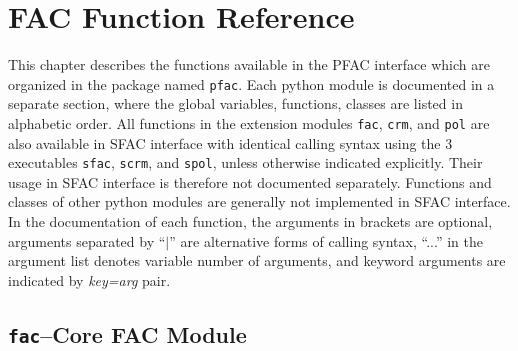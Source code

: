 \documentclass[twoside,letterpaper]{refrep}
\newcommand{\var}[1]{\textit{#1}}
\newcommand{\mod}[1]{\texttt{#1}}
\begin{document}
\chapter{FAC Function Reference}
\label{cha:function}
This chapter describes the functions available in the PFAC interface which are
organized in the package named \mod{pfac}. Each
python module is documented in a separate section, where the global variables,
functions, classes are listed in alphabetic order. All functions in the
extension modules \mod{fac}, \mod{crm}, and \mod{pol} are also available in
SFAC interface with identical calling syntax using the 3 executables
\mod{sfac}, \mod{scrm}, and \mod{spol}, unless otherwise indicated
explicitly. Their usage in SFAC 
interface is therefore not documented separately. Functions and classes of
other python modules are generally not implemented in SFAC interface. In the
documentation of each function, the arguments in brackets are optional,
arguments separated by ``$|$'' are alternative forms of calling syntax,
``...'' in the argument list denotes variable number of arguments, and
keyword arguments are indicated by \var{key=arg} pair.

\section{\mod{fac}--Core FAC Module}
\label{sec:fac}
\end{document}

